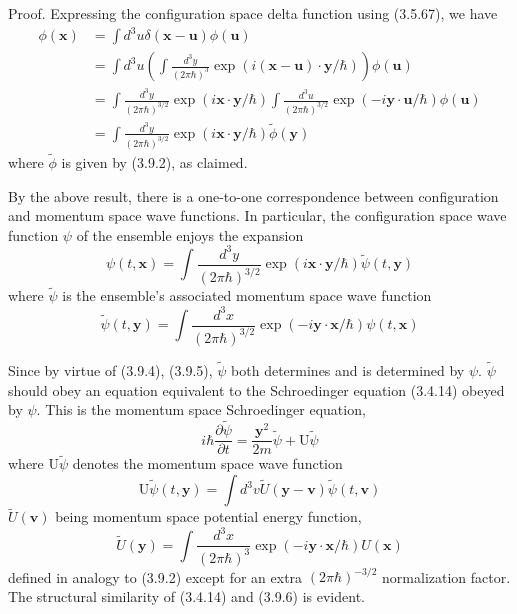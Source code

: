 \documentclass{article}
\begin{document}
Proof. Expressing the configuration space delta function using (3.5.67), we have
$$
\begin{align*}
\phi(\boldsymbol{x}) & =\int d^{3} u \delta(\boldsymbol{x}-\boldsymbol{u}) \phi(\boldsymbol{u})  \tag{3.9.3}\\
& =\int d^{3} u\left(\int \frac{d^{3} y}{(2 \pi \hbar)^{3}} \exp (i(\boldsymbol{x}-\boldsymbol{u}) \cdot \boldsymbol{y} / \hbar)\right) \phi(\boldsymbol{u}) \\
& =\int \frac{d^{3} y}{(2 \pi \hbar)^{3 / 2}} \exp (i \boldsymbol{x} \cdot \boldsymbol{y} / \hbar) \int \frac{d^{3} u}{(2 \pi \hbar)^{3 / 2}} \exp (-i \boldsymbol{y} \cdot \boldsymbol{u} / \hbar) \phi(\boldsymbol{u}) \\
& =\int \frac{d^{3} y}{(2 \pi \hbar)^{3 / 2}} \exp (i \boldsymbol{x} \cdot \boldsymbol{y} / \hbar) \tilde{\phi}(\boldsymbol{y})
\end{align*}
$$
where $\tilde{\phi}$ is given by (3.9.2), as claimed.

By the above result, there is a one-to-one correspondence between configuration and momentum space wave functions. In particular, the configuration space wave function $\psi$ of the ensemble enjoys the expansion
$$
\begin{equation*}
\psi(t, \boldsymbol{x})=\int \frac{d^{3} y}{(2 \pi \hbar)^{3 / 2}} \exp (i \boldsymbol{x} \cdot \boldsymbol{y} / \hbar) \tilde{\psi}(t, \boldsymbol{y}) \tag{3.9.4}
\end{equation*}
$$
where $\tilde{\psi}$ is the ensemble's associated momentum space wave function
$$
\begin{equation*}
\tilde{\psi}(t, \boldsymbol{y})=\int \frac{d^{3} x}{(2 \pi \hbar)^{3 / 2}} \exp (-i \boldsymbol{y} \cdot \boldsymbol{x} / \hbar) \psi(t, \boldsymbol{x}) \tag{3.9.5}
\end{equation*}
$$

Since by virtue of (3.9.4), (3.9.5), $\tilde{\psi}$ both determines and is determined by $\psi$. $\tilde{\psi}$ should obey an equation equivalent to the Schroedinger equation (3.4.14) obeyed by $\psi$. This is the momentum space Schroedinger equation,
$$
\begin{equation*}
i \hbar \frac{\partial \tilde{\psi}}{\partial t}=\frac{\boldsymbol{y}^{2}}{2 m} \tilde{\psi}+\mathrm{U} \tilde{\psi} \tag{3.9.6}
\end{equation*}
$$
where $\mathrm{U} \tilde{\psi}$ denotes the momentum space wave function
$$
\begin{equation*}
\mathrm{U} \tilde{\psi}(t, \boldsymbol{y})=\int d^{3} v \tilde{U}(\boldsymbol{y}-\boldsymbol{v}) \tilde{\psi}(t, \boldsymbol{v}) \tag{3.9.7}
\end{equation*}
$$
$\tilde{U}(\boldsymbol{v})$ being momentum space potential energy function,
$$
\begin{equation*}
\tilde{U}(\boldsymbol{y})=\int \frac{d^{3} x}{(2 \pi \hbar)^{3}} \exp (-i \boldsymbol{y} \cdot \boldsymbol{x} / \hbar) U(\boldsymbol{x}) \tag{3.9.8}
\end{equation*}
$$
defined in analogy to (3.9.2) except for an extra $(2 \pi \hbar)^{-3 / 2}$ normalization factor. The structural similarity of (3.4.14) and (3.9.6) is evident.
\end{document}
